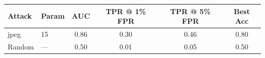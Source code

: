 \begin{tabular}{llcccc}
\toprule
Attack & Param & AUC & TPR @ 1\% FPR & TPR @ 5\% FPR & Best Acc \\
\midrule
jpeg & 15 & 0.86 & 0.30 & 0.46 & 0.80 \\
Random & — & 0.50 & 0.01 & 0.05 & 0.50 \\
\bottomrule
\end{tabular}
